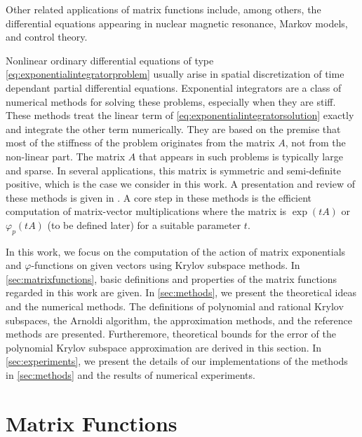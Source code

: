 Other related applications of matrix functions include, among others, the differential equations
appearing in nuclear magnetic resonance, Markov models, and control theory.

Nonlinear ordinary differential equations of type \eqref{eq:exponentialintegratorproblem}
usually arise in spatial discretization of time dependant partial differential equations.
Exponential integrators are a class of numerical methods for solving these problems, especially
when they are stiff. These methods treat the linear term of \eqref{eq:exponentialintegratorsolution}
exactly and integrate the other term numerically. They are based on the premise that most of the
stiffness of the problem originates from the matrix $A$, not from the non-linear part. The matrix
$A$ that appears in such problems is typically large and sparse. In several applications, this matrix
is symmetric and semi-definite positive, which is the case we consider in this work.
A presentation and review of these methods is given in \cite{minchev2005review}.
A core step in these methods is the efficient computation of matrix-vector multiplications where
the matrix is $\exp(tA)$ or $\varphi_p(tA)$ (to be defined later) for a suitable parameter $t$.

In this work, we focus on the computation of the action of matrix exponentials and
$\varphi$-functions on given vectors using Krylov subspace methods.
In \autoref{sec:matrixfunctions}, basic definitions and properties of the matrix functions
regarded in this work are given. In \autoref{sec:methods}, we present the theoretical ideas
and the numerical methods. The definitions of polynomial and rational Krylov subspaces,
the Arnoldi algorithm, the approximation methods, and the reference methods are presented.
Furtheremore, theoretical bounds for the error of the polynomial Krylov subspace approximation
are derived in this section. In \autoref{sec:experiments}, we present the details of our
implementations of the methods in \autoref{sec:methods} and the results of numerical experiments.


\section{Matrix Functions}
\label{sec:matrixfunctions}

